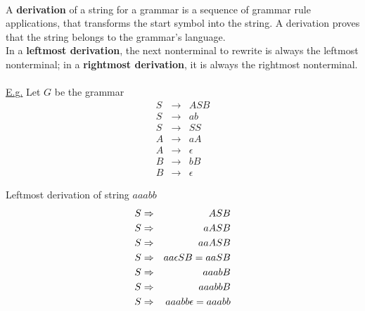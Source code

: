 \documentclass[8pt,letterpaper,twocolumn]{article}
\begin{document}
\\
A \textbf{derivation} of a string for a grammar is a sequence of grammar rule applications,
that transforms the start symbol into the string. A derivation proves that the
string belongs to the grammar's language. \\
In a \textbf{leftmost derivation}, the next nonterminal to rewrite is always the leftmost nonterminal;
in a \textbf{rightmost derivation}, it is always the rightmost nonterminal. \\
\\
\underline{E.g.} %
Let $G$ be the grammar
\begin{eqnarray}
  S &\rightarrow& ASB \\
  S &\rightarrow& ab \\
  S &\rightarrow& SS \\
  A &\rightarrow& aA \\
  A &\rightarrow& \epsilon \\
  B &\rightarrow& bB \\
  B &\rightarrow& \epsilon
\end{eqnarray}

Leftmost derivation of string $aaabb$
  \begin{eqnarray}
    \setcounter{equation}{1}
    S &\Rightarrow& ASB \\
    \setcounter{equation}{4}
    S &\Rightarrow& aASB \\
    \setcounter{equation}{4}
    S &\Rightarrow& aaASB \\
    \setcounter{equation}{5}
    S &\Rightarrow& aa \epsilon SB = aaSB \\
    \setcounter{equation}{2}
    S &\Rightarrow& aaabB \\
    \setcounter{equation}{6}
    S &\Rightarrow& aaabbB \\
    \setcounter{equation}{7}
    S &\Rightarrow& aaabb\epsilon = aaabb
  \end{eqnarray}
\end{document}
